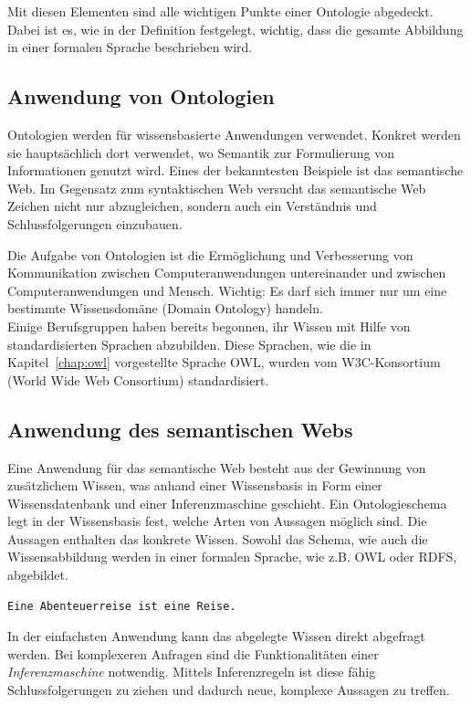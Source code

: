Mit diesen Elementen sind alle wichtigen Punkte einer Ontologie abgedeckt. Dabei ist es, wie in der Definition festgelegt, wichtig, dass die gesamte Abbildung in einer formalen Sprache beschrieben wird.

\subsection{Anwendung von Ontologien}
\label{subsec:ontologien_onto_anwendung}
Ontologien werden für wissensbasierte Anwendungen verwendet. Konkret werden sie hauptsächlich dort verwendet, wo Semantik zur Formulierung von Informationen genutzt wird. Eines der bekanntesten Beispiele ist das semantische Web. Im Gegensatz zum syntaktischen Web versucht das semantische Web Zeichen nicht nur abzugleichen, sondern auch ein Verständnis und Schlussfolgerungen einzubauen.

Die Aufgabe von Ontologien ist die Ermöglichung und Verbesserung von Kommunikation zwischen Computeranwendungen untereinander und zwischen Computeranwendungen und Mensch. Wichtig: Es darf sich immer nur um eine bestimmte Wissensdomäne (Domain Ontology) handeln.\\
Einige Berufsgruppen haben bereits begonnen, ihr Wissen mit Hilfe von standardisierten Sprachen abzubilden. Diese Sprachen, wie die in Kapitel~\ref{chap:owl} vorgestellte Sprache OWL, wurden vom W3C-Konsortium (World Wide Web Consortium) standardisiert.

\subsection{Anwendung des semantischen Webs}
\label{subsec:ontologien_onto_SemantikWebAnwendung}
Eine Anwendung für das semantische Web besteht aus der Gewinnung von zusätzlichem Wissen, was anhand einer Wissensbasis in Form einer Wissensdatenbank und einer Inferenzmaschine geschieht. Ein Ontologieschema legt in der Wissensbasis fest, welche Arten von Aussagen möglich sind. Die Aussagen enthalten das konkrete Wissen. Sowohl das Schema, wie auch die Wissensabbildung werden in einer formalen Sprache, wie z.B. OWL oder RDFS, abgebildet.

\begin{lstlisting}[caption={Beispiel einer Aussage in einer Wissensbasis.}]
Eine Abenteuerreise ist eine Reise.
\end{lstlisting}

In der einfachsten Anwendung kann das abgelegte Wissen direkt abgefragt werden. Bei komplexeren Anfragen sind die Funktionalitäten einer \textit{Inferenzmaschine} notwendig. Mittels Inferenzregeln ist diese fähig Schlussfolgerungen zu ziehen und dadurch neue, komplexe Aussagen zu treffen.

